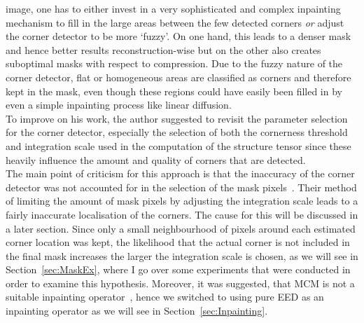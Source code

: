 image, one has to either invest in a very sophisticated and complex inpainting mechanism to fill in
the large areas between the few detected corners \textit{or} adjust the corner detector to be more
`fuzzy'. On one hand, this leads to a denser mask and hence better results reconstruction-wise 
but on the other also creates suboptimal masks with respect to compression. Due to the fuzzy nature of the
corner detector, flat or homogeneous areas are classified as corners and therefore kept in the
mask, even though these regions could have easily been filled in by even a simple inpainting
process like linear diffusion. \\
To improve on his work, the author suggested to revisit the parameter
selection for the corner detector, especially the selection of both the cornerness threshold and
integration scale used in the computation of the structure tensor since these heavily influence the
amount and quality of corners that are detected. \\
The main point of criticism for this approach is that the inaccuracy of the corner 
detector was not accounted for in the selection of the mask
pixels~\cite{conversation}. Their method of limiting the amount of mask pixels by adjusting the integration scale leads
to a fairly inaccurate localisation of the corners. The cause for this will be discussed in
a later section.
Since only a small neighbourhood of pixels around each estimated corner
location was kept, the likelihood that the actual corner is not included in the final mask
increases the larger the integration scale is chosen, as we will see in Section~\ref{sec:MaskEx},
where I go over some experiments that were conducted in order to examine this hypothesis.
Moreover, it was suggested, that MCM is not a suitable inpainting operator~\cite{conversation},
hence we switched to using pure EED as an inpainting operator as we will see in
Section~\ref{sec:Inpainting}.\\


